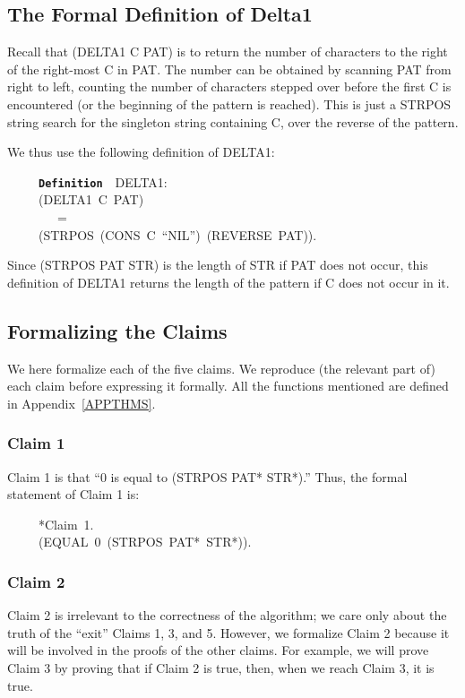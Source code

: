\documentclass[11pt]{book}
\newenvironment{pubasis}{\begin{flushleft}\ttfamily\small}{\normalsize\rmfamily\end{flushleft}}
\newcommand{\axiomordefinition}[1]{\vspace{6pt}\texttt{\textbf{#1}}}
\newcommand{\pubdefaulttextsize}{\large}
\begin{document}
\subsection{The Formal Definition of Delta1}
\pubdefaulttextsize
Recall that (DELTA1 C PAT) is to return the number of characters to the
right of the right-most C in PAT.  The number can be obtained by
scanning PAT from right to left, counting the number of characters stepped
over before the first C is encountered (or the beginning of the
pattern is reached).  This is just a STRPOS string search for
the singleton string containing C, over the reverse of the pattern.

We thus  use the following definition of DELTA1:
\begin{pubasis}
~~~~~\axiomordefinition{Definition}~~DELTA1:\\
~~~~~(DELTA1~C~PAT)\\
~~~~~~~~=\\
~~~~~(STRPOS~(CONS~C~``NIL'')~(REVERSE~PAT)).\\
\end{pubasis}
Since (STRPOS PAT STR) is the length of STR if PAT does not occur,
this definition of DELTA1 returns the length of the pattern if C does not occur
in it.
\subsection{Formalizing the Claims}
\pubdefaulttextsize
We  here formalize each of the five claims.  We reproduce (the relevant part of) each claim before
expressing it formally.  All the functions mentioned are defined in Appendix~\ref{APPTHMS}.
\subsubsection{Claim 1}
\pubdefaulttextsize
Claim 1 is that ``0 is equal to (STRPOS PAT* STR*).''
Thus, the formal statement of Claim 1 is:
\begin{pubasis}
~~~~~*Claim~1.\\
~~~~~(EQUAL~0~(STRPOS~PAT*~STR*)).\\
\end{pubasis}
\subsubsection{Claim 2}
\pubdefaulttextsize
Claim 2 is irrelevant to the correctness of the algorithm;
we care only about the truth of the ``exit'' Claims 1, 3, and 5.
However, we  formalize Claim 2 because it will be involved in the
proofs of the other claims.  For example, we will prove Claim 3 by proving that if
Claim 2 is true, then, when we reach Claim 3, it is true.
\end{document}

